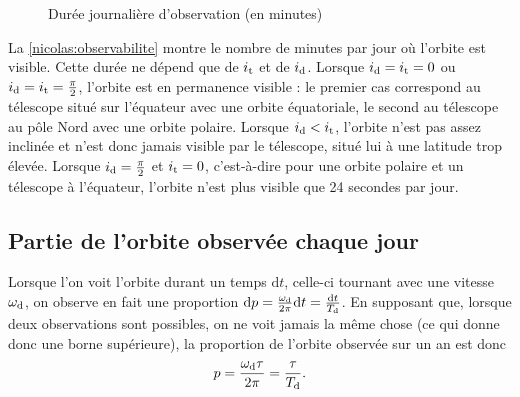 \begin{figure}
\scriptsize
\begin{center}
\def\svgwidth{0.5\linewidth}
 
 \vspace*{-2em}
\caption{Durée journalière d'observation (en minutes)} \label{nicolas:observabilite}
\end{center}
\end{figure}%

La \autoref{nicolas:observabilite} montre le nombre de minutes par jour où l'orbite est visible. Cette durée ne dépend que de $i_\text{t}$ et de $i_\text{d}$. Lorsque $i_\text{d}=i_\text{t}=0$ ou $i_\text{d}=i_\text{t}=\frac{\pi}{2}$, l'orbite est en permanence visible : le premier cas correspond au télescope situé sur l'équateur avec une orbite équatoriale, le second au télescope au pôle Nord avec une orbite polaire. Lorsque $i_\text{d} < i_\text{t}$, l'orbite n'est pas assez inclinée et n'est donc jamais visible par le télescope, situé lui à une latitude trop élevée. Lorsque $i_\text{d} = \frac{\pi}{2}$ et $i_\text{t} = 0$, c'est-à-dire pour une orbite polaire et un télescope à l'équateur, l'orbite n'est plus visible que 24 secondes par jour. 


\subsection{Partie de l'orbite observée chaque jour}

Lorsque l'on voit l'orbite durant un temps $\mathrm{d}t$, celle-ci tournant avec une vitesse $\omega_\text{d}$, on observe en fait une proportion $\mathrm{d}p = \frac{\omega_\text{d}}{2\pi} \mathrm{d} t = \frac{\mathrm{d}t}{T_\text{d}}$. En supposant que, lorsque deux observations sont possibles, on ne voit jamais la même chose (ce qui donne donc une borne supérieure), la proportion de l'orbite observée sur un an est donc
\[ p = \frac{\omega_\text{d} \tau}{2\pi} = \frac{\tau}{T_\text{d}}.\]


